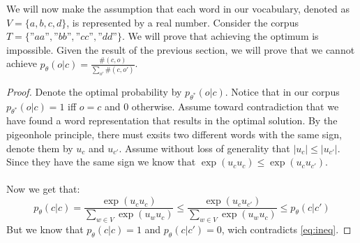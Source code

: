 We will now make the assumption that each word in
our vocabulary, denoted as $V = \{a, b, c, d\}$, 
is represented by a real number. Consider the corpus $T = \{”aa”, ”bb”, ”cc”, ”dd”\}$.
We will prove that achieving the optimum is impossible.
Given the result of the previous section, we will prove that we cannot achieve $ p_\theta(o|c) = \frac{\#(c,o)}{\sum_{o'}\#(c,o')}$.
\begin{proof}
    Denote the optimal probability by $ p_{\theta^*}(o|c)$.
    Notice that in our corpus $p_{\theta^*}(o|c)=1$ iff $o=c$ and $0$ otherwise.
    Assume toward contradiction that we have found a word representation that results in the optimal solution.
    By the pigeonhole principle, there must exsits two different words with the same sign, denote them by $u_c$ and $u_{c'}$.
    Assume without loss of generality that $|u_c|\le|u_{c'}|$.
    Since they have the same sign we know that $\exp{(u_cu_c)}\le\exp{(u_cu_{c'})}$.\\\\Now we get that:
    \begin{equation}\label{eq:ineq}
        p_\theta(c|c)= \frac{\exp{(u_cu_c)}}{\sum_{w\in V}\exp{(u_wu_c)}} \le \frac{\exp{(u_cu_{c'})}}{\sum_{w\in V}\exp{(u_wu_c)}} \le p_{\theta}(c|c')
    \end{equation}
    But we know that $p_\theta(c|c)=1$ and $ p_{\theta}(c|c')=0$, wich contradicts \ref{eq:ineq}.
\end{proof}
